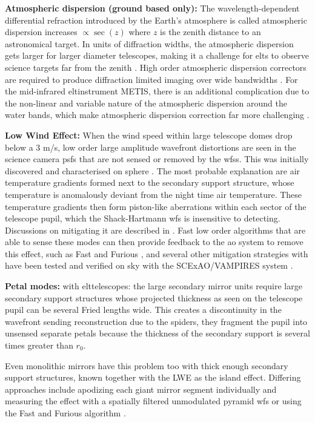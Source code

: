 \documentclass[letterpaper]{ar-1col}
\begin{document}
{\bf Atmospheric dispersion (ground based only):} The wavelength-dependent differential refraction introduced by the Earth's atmosphere is called atmospheric dispersion increases $\propto \sec(z)$ where $z$ is the zenith distance to an astronomical target.
%
In units of diffraction widths, the atmospheric dispersion gets larger for larger diameter telescopes, making it a challenge for \acp{elt} to observe science targets far from the zenith \citep{Kendrew08,Skemer09}.
%
High order atmospheric dispersion correctors are required to produce diffraction limited imaging over wide bandwidths \citep{Kopon13}.
%
For the mid-infrared \ac{elt}instrument METIS, there is an additional complication due to the non-linear and variable nature of the atmospheric dispersion around the water bands, which make atmospheric dispersion correction far more challenging \citep{Absil22}.

{\bf Low Wind Effect: } When the wind speed within large telescope domes drop below a 3 m/s, low order large amplitude wavefront distortions are seen in the science camera \acp{psf} that are not sensed or removed by the \acp{wfs}.
%
This was initially discovered and characterised on \ac{sphere} \citep{Sauvage16}.
%
The most probable explanation are air temperature gradients formed next to the secondary support structure, whose temperature is anomalously deviant from the night time air temperature.
%
These temperature gradients then form piston-like aberrations within each sector of the telescope pupil, which the Shack-Hartmann \ac{wfs} is insensitive to detecting.
%
Discussions on mitigating it are described in \citet{Milli18}.
%
Fast low order algorithms that are able to sense these modes can then provide feedback to the \ac{ao} system to remove this effect, such as Fast and Furious \citep{Wilby18}, and several other mitigation strategies with have been tested and verified on sky with the SCExAO/VAMPIRES system \citep{Vievard19}.

{\bf Petal modes: } with \ac{elt}telescopes: the large secondary mirror units require large secondary support structures whose projected thickness as seen on the telescope pupil can be several Fried lengths wide.
%
This creates a discontinuity in the wavefront sending reconstruction due to the spiders, they fragment the pupil into unsensed separate petals because the thickness of the secondary support is several times greater than $r_0$.

Even monolithic mirrors have this problem too with thick enough secondary support structures, known together with the LWE as the island effect.
%
Differing approaches include apodizing each giant mirror segment individually \citep[Redundant Apodized Pupils; RAP ][]{Leboulleux22,Leboulleux22a} and  measuring the effect with a spatially filtered unmodulated pyramid \ac{wfs} \citep{Levraud24} or using the Fast and Furious algorithm  \citep[ demonstrated on Subaru/SCExAO in][]{Bos20}.
\end{document}
